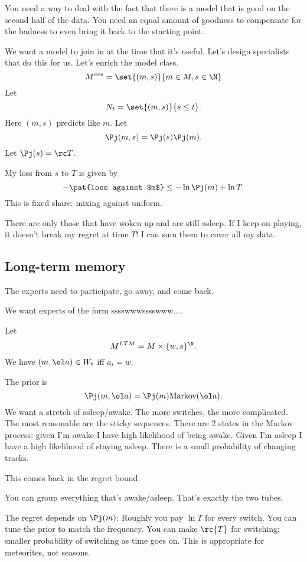 You need a way to deal with the fact that there is a model that is good on the second half of the data. You need an equal amount of goodness to compensate for the badness to even bring it back to the starting point.

We want a model to join in at the time that it's useful. 
Let's design specialists that do this for us. Let's enrich the model class.
$$
M^{res} = \set{(m,s)}{m\in M, s\in \N}
$$
Let 
$$
N_t = \set{(m,s)}{s\le t}.
$$
Here $(m,s)$ predicts like $m$. Let
$$
\Pj(m,s) = \Pj(s)\Pj(m).
$$
Let $\Pj(s)=\rc T$.

My loss from $s$ to $T$ is given by 
$$
-\pat{loss  against $m$}\le -\ln \Pj(m) + \ln T.
$$
This is fixed share: mixing against uniform.

There are only those that have woken up and are still asleep.
If I keep on playing, it doesn't break my regret at time $T$! I can sum them to cover all my data.

\subsection{Long-term memory}
The experts need to participate, go away, and come back.

We want experts of the form sssswwwsssswww....

Let 
$$
M^{LTM} = M\times \{w,s\}^{\N}.
$$
We have $(m,\ol a)\in W_t$ iff $a_t=w$.

The prior is
$$
\Pj(m,\ol a) = \Pj(m) \text{Markov}(\ol a).
$$
We want a stretch of asleep/awake. The more switches, the more complicated. The most reasonable are the sticky sequences.
There are 2 states in the Markov process: given I'm awake I have high likelihood of being awake. Given I'm asleep I have a high likelihood of staying asleep. There is a small probability of changing tracks.

This comes back in the regret bound.

You can group everything that's awake/asleep. That's exactly the two tubes.

The regret depends on $\Pj(m)$: %
Roughly you pay $\ln T$ for every switch. You can tune the prior to match the frequency. 
You can make $\rc{T}$ for switching: smaller probability of switching as time goes on. %
This is appropriate for meteorites, not seasons.

